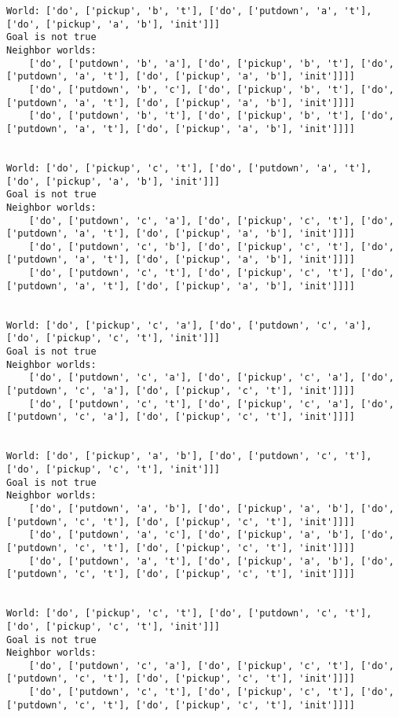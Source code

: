 \documentclass[11pt]{article}
\begin{document}
\begin{Verbatim}[commandchars=\\\{\}]
World: ['do', ['pickup', 'b', 't'], ['do', ['putdown', 'a', 't'], ['do', ['pickup', 'a', 'b'], 'init']]]
Goal is not true
Neighbor worlds:
    ['do', ['putdown', 'b', 'a'], ['do', ['pickup', 'b', 't'], ['do', ['putdown', 'a', 't'], ['do', ['pickup', 'a', 'b'], 'init']]]]
    ['do', ['putdown', 'b', 'c'], ['do', ['pickup', 'b', 't'], ['do', ['putdown', 'a', 't'], ['do', ['pickup', 'a', 'b'], 'init']]]]
    ['do', ['putdown', 'b', 't'], ['do', ['pickup', 'b', 't'], ['do', ['putdown', 'a', 't'], ['do', ['pickup', 'a', 'b'], 'init']]]]


World: ['do', ['pickup', 'c', 't'], ['do', ['putdown', 'a', 't'], ['do', ['pickup', 'a', 'b'], 'init']]]
Goal is not true
Neighbor worlds:
    ['do', ['putdown', 'c', 'a'], ['do', ['pickup', 'c', 't'], ['do', ['putdown', 'a', 't'], ['do', ['pickup', 'a', 'b'], 'init']]]]
    ['do', ['putdown', 'c', 'b'], ['do', ['pickup', 'c', 't'], ['do', ['putdown', 'a', 't'], ['do', ['pickup', 'a', 'b'], 'init']]]]
    ['do', ['putdown', 'c', 't'], ['do', ['pickup', 'c', 't'], ['do', ['putdown', 'a', 't'], ['do', ['pickup', 'a', 'b'], 'init']]]]


World: ['do', ['pickup', 'c', 'a'], ['do', ['putdown', 'c', 'a'], ['do', ['pickup', 'c', 't'], 'init']]]
Goal is not true
Neighbor worlds:
    ['do', ['putdown', 'c', 'a'], ['do', ['pickup', 'c', 'a'], ['do', ['putdown', 'c', 'a'], ['do', ['pickup', 'c', 't'], 'init']]]]
    ['do', ['putdown', 'c', 't'], ['do', ['pickup', 'c', 'a'], ['do', ['putdown', 'c', 'a'], ['do', ['pickup', 'c', 't'], 'init']]]]


World: ['do', ['pickup', 'a', 'b'], ['do', ['putdown', 'c', 't'], ['do', ['pickup', 'c', 't'], 'init']]]
Goal is not true
Neighbor worlds:
    ['do', ['putdown', 'a', 'b'], ['do', ['pickup', 'a', 'b'], ['do', ['putdown', 'c', 't'], ['do', ['pickup', 'c', 't'], 'init']]]]
    ['do', ['putdown', 'a', 'c'], ['do', ['pickup', 'a', 'b'], ['do', ['putdown', 'c', 't'], ['do', ['pickup', 'c', 't'], 'init']]]]
    ['do', ['putdown', 'a', 't'], ['do', ['pickup', 'a', 'b'], ['do', ['putdown', 'c', 't'], ['do', ['pickup', 'c', 't'], 'init']]]]


World: ['do', ['pickup', 'c', 't'], ['do', ['putdown', 'c', 't'], ['do', ['pickup', 'c', 't'], 'init']]]
Goal is not true
Neighbor worlds:
    ['do', ['putdown', 'c', 'a'], ['do', ['pickup', 'c', 't'], ['do', ['putdown', 'c', 't'], ['do', ['pickup', 'c', 't'], 'init']]]]
    ['do', ['putdown', 'c', 't'], ['do', ['pickup', 'c', 't'], ['do', ['putdown', 'c', 't'], ['do', ['pickup', 'c', 't'], 'init']]]]



\end{Verbatim}
\end{document}
